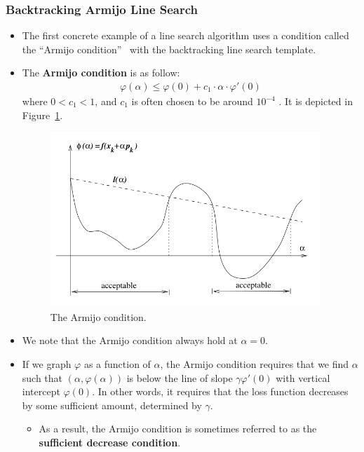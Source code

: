 \documentclass[10pt]{article}
\begin{document}
\subsubsection{Backtracking Armijo Line Search}

\begin{itemize}
    \item The first concrete example of a line search algorithm uses a condition called the ``Armijo condition''~\cite{Norcedal:2006} with the backtracking line search template.
    
    \item The {\bf Armijo condition} is as follow:
    \begin{align*}
        \varphi(\alpha) \leq \varphi(0) + c_1 \cdot \alpha \cdot \varphi'(0)
    \end{align*}
    where $0 < c_1 < 1$, and $c_1$ is often chosen to be around $10^{-4}$ \cite{Norcedal:2006}. It is depicted in Figure~\ref{fig:armijo-condition}.

    \begin{figure}
        \centering
        \includegraphics[width=4in]{armijo.png}
        \caption{The Armijo condition.}
        \label{fig:armijo-condition}        
    \end{figure}

    \item We note that the Armijo condition always hold at $\alpha = 0$.

    \item If we graph $\varphi$ as a function of $\alpha$, the Armijo condition requires that we find $\alpha$ such that $(\alpha, \varphi(\alpha))$ is below the line of slope $\gamma \varphi'(0)$ with vertical intercept $\varphi(0)$. In other words, it requires that the loss function decreases by some sufficient amount, determined by $\gamma$.
    \begin{itemize}
        \item As a result, the Armijo condition is sometimes referred to as the {\bf sufficient decrease condition}.        
    \end{itemize}


\end{itemize}
\end{document}

